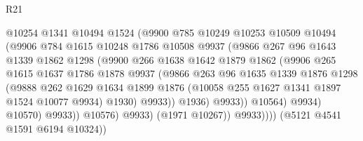 \begin{lexlean}{R21}
\begin{coremodule}
                            @10254
                            @1341
                            @10494
                            @1524
                            (@9900
                              @785
                              @10249
                              @10253
                              @10509
                              @10494
                              (@9906
                                @784
                                @1615
                                @10248
                                @1786
                                @10508
                                @9937
                                (@9866
                                  @267
                                  @96
                                  @1643
                                  @1339
                                  @1862
                                  @1298
                                  (@9900
                                    @266
                                    @1638
                                    @1642
                                    @1879
                                    @1862
                                    (@9906
                                      @265
                                      @1615
                                      @1637
                                      @1786
                                      @1878
                                      @9937
                                      (@9866
                                        @263
                                        @96
                                        @1635
                                        @1339
                                        @1876
                                        @1298
                                        (@9888
                                          @262
                                          @1629
                                          @1634
                                          @1899
                                          @1876
                                          (@10058 @255 @1627 @1341 @1897 @1524 @10077 @9934)
                                          @1930)
                                        @9933))
                                    @1936)
                                  @9933))
                              @10564)
                            @9934)
                          @10570)
                        @9933))
                    @10576)
                  @9933)
                (@1971 @10267))
              @9933))))
      (@5121 @4541 @1591 @6194 @10324))

\end{coremodule}
\end{lexlean}
